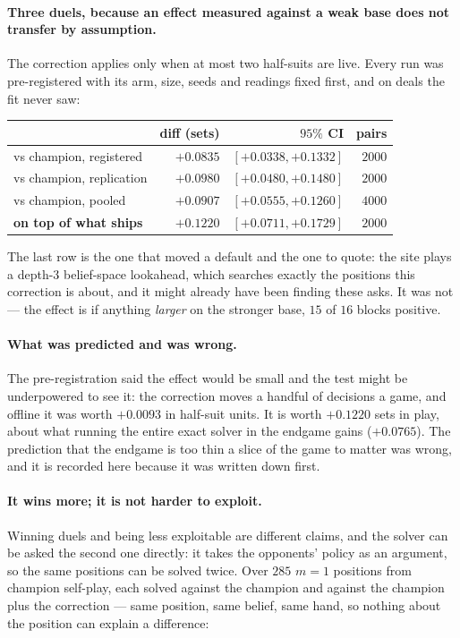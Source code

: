\documentclass[11pt,a4paper]{article}
\begin{document}
\paragraph{Three duels, because an effect measured against a weak base does not
transfer by assumption.} The correction applies only when at most two
half-suits are live. Every run was pre-registered with its arm, size, seeds and
readings fixed first, and on deals the fit never saw:

\begin{center}
\begin{tabular}{lrrr}
\toprule
& diff (sets) & $95\%$ CI & pairs \\
\midrule
vs champion, registered   & $+0.0835$ & $[+0.0338, +0.1332]$ & $2000$ \\
vs champion, replication  & $+0.0980$ & $[+0.0480, +0.1480]$ & $2000$ \\
vs champion, pooled       & $+0.0907$ & $[+0.0555, +0.1260]$ & $4000$ \\
\textbf{on top of what ships} & $\mathbf{+0.1220}$ &
  $\mathbf{[+0.0711, +0.1729]}$ & $2000$ \\
\bottomrule
\end{tabular}
\end{center}

The last row is the one that moved a default and the one to quote: the site
plays a depth-3 belief-space lookahead, which searches exactly the positions
this correction is about, and it might already have been finding these asks.
It was not --- the effect is if anything \emph{larger} on the stronger base,
$15$ of $16$ blocks positive.

\paragraph{What was predicted and was wrong.} The pre-registration said the
effect would be small and the test might be underpowered to see it: the
correction moves a handful of decisions a game, and offline it was worth
$+0.0093$ in half-suit units. It is worth $+0.1220$ sets in play, about what
running the entire exact solver in the endgame gains ($+0.0765$). The
prediction that the endgame is too thin a slice of the game to matter was
wrong, and it is recorded here because it was written down first.

\paragraph{It wins more; it is not harder to exploit.} Winning duels and being
less exploitable are different claims, and the solver can be asked the second
one directly: it takes the opponents' policy as an argument, so the same
positions can be solved twice. Over $285$ $m = 1$ positions from champion
self-play, each solved against the champion and against the champion plus the
correction --- same position, same belief, same hand, so nothing about the
position can explain a difference:
\end{document}

